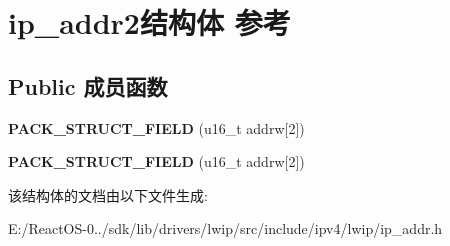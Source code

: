 \hypertarget{structip__addr2}{}\section{ip\+\_\+addr2结构体 参考}
\label{structip__addr2}
\subsection*{Public 成员函数}
\begin{DoxyCompactItemize}
\item 
\mbox{\label{structip__addr2_a098e42efa61e0c431ab501098426767d}} 
{\bfseries P\+A\+C\+K\+\_\+\+S\+T\+R\+U\+C\+T\+\_\+\+F\+I\+E\+LD} (u16\+\_\+t addrw\mbox{[}2\mbox{]})
\item 
\mbox{\label{structip__addr2_a098e42efa61e0c431ab501098426767d}} 
{\bfseries P\+A\+C\+K\+\_\+\+S\+T\+R\+U\+C\+T\+\_\+\+F\+I\+E\+LD} (u16\+\_\+t addrw\mbox{[}2\mbox{]})
\end{DoxyCompactItemize}


该结构体的文档由以下文件生成\+:\begin{DoxyCompactItemize}
\item 
E\+:/\+React\+O\+S-\/0../sdk/lib/drivers/lwip/src/include/ipv4/lwip/ip\+\_\+addr.\+h\end{DoxyCompactItemize}
